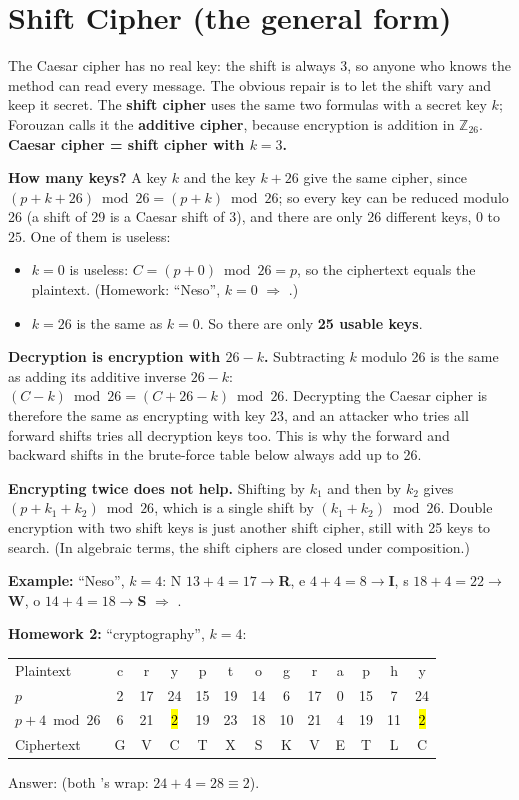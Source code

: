 \section{Shift Cipher (the general form)}\label{sec:shift}

The Caesar cipher has no real key: the shift is always 3, so anyone who knows the method can read every message. The obvious repair is to let the shift vary and keep it secret. The \textbf{shift cipher} uses the same two formulas with a secret key $k$; Forouzan calls it the \textbf{additive cipher}, because encryption is addition in $\mathbb{Z}_{26}$. \textbf{Caesar cipher = shift cipher with $k=3$.}

\textbf{How many keys?} A key $k$ and the key $k + 26$ give the same cipher, since $(p + k + 26) \bmod 26 = (p + k) \bmod 26$; so every key can be reduced modulo 26 (a shift of 29 is a Caesar shift of 3), and there are only 26 different keys, $0$ to $25$. One of them is useless:
\begin{itemize}
  \item $k=0$ is useless: $C = (p+0) \bmod 26 = p$, so the ciphertext equals the plaintext. (Homework: ``Neso'', $k=0$ $\Rightarrow$ .)
  \item $k=26$ is the same as $k=0$. So there are only \textbf{25 usable keys}.
\end{itemize}

\textbf{Decryption is encryption with $26 - k$.} Subtracting $k$ modulo 26 is the same as adding its additive inverse $26 - k$: $(C - k) \bmod 26 = (C + 26 - k) \bmod 26$. Decrypting the Caesar cipher is therefore the same as encrypting with key 23, and an attacker who tries all forward shifts tries all decryption keys too. This is why the forward and backward shifts in the brute-force table below always add up to 26.

\textbf{Encrypting twice does not help.} Shifting by $k_1$ and then by $k_2$ gives $(p + k_1 + k_2) \bmod 26$, which is a single shift by $(k_1 + k_2) \bmod 26$. Double encryption with two shift keys is just another shift cipher, still with 25 keys to search. (In algebraic terms, the shift ciphers are closed under composition.)

\textbf{Example:} ``Neso'', $k=4$: \;
N $13{+}4{=}17\to$\textbf{R},\;
e $4{+}4{=}8\to$\textbf{I},\;
s $18{+}4{=}22\to$\textbf{W},\;
o $14{+}4{=}18\to$\textbf{S} \;$\Rightarrow$\; \textbf{}.

\textbf{Homework 2:} ``cryptography'', $k=4$:
\begin{center}\small\setlength{\tabcolsep}{4.5pt}
\begin{tabular}{@{}l*{12}{c}@{}}
\toprule
Plaintext & c&r&y&p&t&o&g&r&a&p&h&y\\
$p$ & 2&17&24&15&19&14&6&17&0&15&7&24\\
$p+4 \bmod 26$ & 6&21&\hl{2}&19&23&18&10&21&4&19&11&\hl{2}\\
Ciphertext & G&V&C&T&X&S&K&V&E&T&L&C\\
\bottomrule
\end{tabular}
\end{center}
Answer: \textbf{} (both 's wrap: $24+4=28 \equiv 2$).

